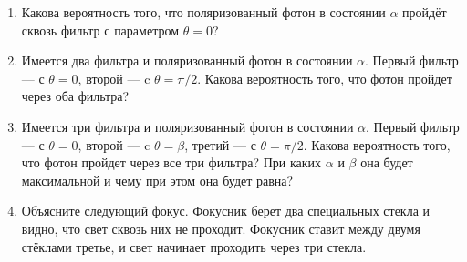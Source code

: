 \begin{enumerate}
\begin{enumerate}
\item Какова вероятность того, что поляризованный фотон в состоянии $\alpha$ пройдёт
сквозь фильтр с параметром $\theta=0$?
\item Имеется два фильтра и поляризованный фотон в состоянии $\alpha$. Первый
фильтр — с $\theta=0$, второй — c $\theta=\pi/2$. Какова вероятность того, что
фотон пройдет через оба фильтра?
\item Имеется три фильтра и поляризованный фотон в состоянии $\alpha$. Первый
фильтр — с $\theta=0$, второй — c $\theta=\beta$, третий — с $\theta=\pi/2$.
Какова вероятность того, что фотон пройдет через все три фильтра? При каких $\alpha$
и $\beta$ она будет максимальной и чему при этом она будет равна?
\item Объясните следующий фокус. Фокусник берет два специальных стекла и видно,
что свет сквозь них не проходит. Фокусник ставит между двумя стёклами третье, и
свет начинает проходить через три стекла.
\end{enumerate}
\end{enumerate}
